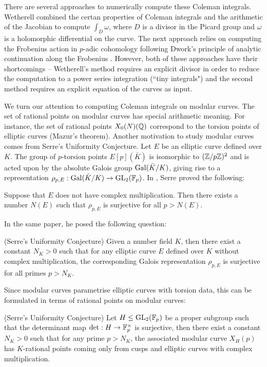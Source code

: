 There are several approaches to numerically compute these Coleman integrals. Wetherell \cite{wetherell} combined the certan properties of Coleman integrals and the arithmetic of the Jacobian to compute $\int_D \omega$, where $D$ is a divisor in the Picard group and $\omega$ is a holomorphic differential on the curve. The next approach relies on computing the Frobenius action in $p$-adic cohomology following Dwork's principle of analytic continuation along the Frobenius \cite{BBK10,Tui16,Tui17,BT_coleman}. However, both of these approaches have their shortcomings -- Wetherell's method requires an explicit divisor in order to reduce the computation to a power series integration (``tiny integrals") and the second method requires an explicit equation of the curves as input.

We turn our attention to computing Coleman integrals on modular curves. The set of rational points on modular curves has special arithmetic meaning. For instance, the set of rational points $X_0(N)(\mathbb{Q})$ correspond to the torsion points of elliptic curves (Mazur's theorem). Another motivation to study modular curves comes from Serre's Uniformity Conjecture. Let $E$ be an elliptic curve defined over $K$. The group of $p$-torsion points $E[p](\bar{K})$ is isomorphic to $(\mathbb{Z}/p\mathbb{Z})^2$ and is acted upon by the absolute Galois group $\operatorname{Gal}(\bar{K}/K)$, giving rise to a representation $\rho_ {p,E}: \operatorname{Gal}(\bar{K}/K) \rightarrow \operatorname{GL}_2(\mathbb{F}_p)$. In \cite{serre72}, Serre proved the following:

\begin{theorem}
    Suppose that $E$ does not have complex multiplication. Then there exists a number $N(E)$ such that $\rho_{p,E}$ is surjective for all $p > N(E)$.
\end{theorem}

In the same paper, he posed the following question:

\begin{conj}{(Serre's Uniformity Conjecture)}
Given a number field $K$, then there exist a constant $N_K>0$ such that for any elliptic curve $E$ defined over $K$ without complex multiplication, the corresponding Galois representation $\rho_{p,E}$ is surjective for all primes $p > N_K$.
\end{conj}

Since modular curves parametrise elliptic curves with torsion data, this can be formulated in terms of rational points on modular curves:

\begin{conj}{(Serre's Uniformity Conjecture)}
    Let $H \leq \operatorname{GL}_2(\mathbb{F}_p)$ be a proper subgroup such that the determinant map $\det: H \rightarrow \mathbb{F}_p^\times$ is surjective, then there exist a constant $N_K>0$ such that for any prime $p> N_K$, the associated modular curve $X_H(p)$ has $K$-rational points coming only from cusps and elliptic curves with complex multiplication.
\end{conj}




